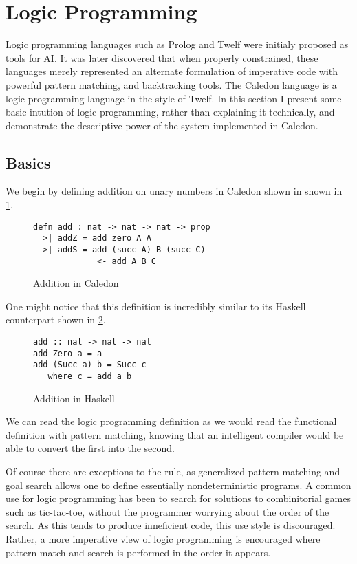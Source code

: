 \section{Logic Programming}

Logic programming languages such as Prolog and Twelf were initialy proposed as tools for AI.  
It was later discovered that when properly constrained, these languages merely represented an alternate
formulation of imperative code with powerful pattern matching, and backtracking tools.  The Caledon language
is a logic programming language in the style of Twelf.  In this section I present some basic intution of logic 
programming, rather than explaining it technically, and demonstrate the descriptive
power of the system implemented in Caledon.

\subsection{Basics}
We begin by defining addition on unary numbers in Caledon shown in shown in \ref{code:add}.

\begin{figure}[h]
\begin{lstlisting}
defn add : nat -> nat -> nat -> prop
  >| addZ = add zero A A
  >| addS = add (succ A) B (succ C) 
             <- add A B C
\end{lstlisting}
\caption{Addition in Caledon}
\label{code:add}
\end{figure}

One might notice that this definition is incredibly similar to its Haskell counterpart shown in \ref{code:hask}.

\begin{figure}[h]
\begin{lstlisting}
add :: nat -> nat -> nat
add Zero a = a
add (Succ a) b = Succ c
   where c = add a b
\end{lstlisting}
\caption{Addition in Haskell}
\label{code:hask}
\end{figure}

We can read the logic programming definition as we would read the functional definition with pattern
matching, knowing that an intelligent compiler would be able to convert the first into the second.  

Of course there are exceptions to the rule, as generalized pattern matching and 
goal search allows one to define essentially nondeterministic programs.  A common use for logic programming
has been to search for solutions to combinitorial games such as tic-tac-toe, without the programmer worrying about the order
of the search.  As this tends to produce inneficient code, this use style is discouraged.  Rather, a more imperative 
view of logic programming is encouraged where pattern match and search is performed in the order it appears.  

